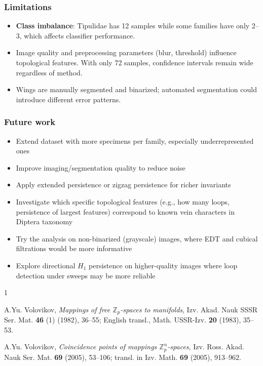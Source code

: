 \documentclass{birkjour}
\theoremstyle{definition}
\theoremstyle{remark}
\numberwithin{equation}{section}
\begin{document}
\subsubsection{Limitations}\quad

\begin{itemize}
    \item \textbf{Class imbalance}: Tipulidae has 12 samples while some families have only 2–3, which affects classifier performance.
    \item Image quality and preprocessing parameters (blur, threshold) influence topological features.
    With only 72 samples, confidence intervals remain wide regardless of method.
    \item Wings are manually segmented and binarized; automated segmentation could introduce different error patterns.
\end{itemize}

\subsubsection{Future work}\quad

\begin{itemize}
    \item Extend dataset with more specimens per family, especially underrepresented ones
    \item Improve imaging/segmentation quality to reduce noise
    \item Apply extended persistence or zigzag persistence for richer invariants
    \item Investigate which specific topological features (e.g., how many loops, persistence of largest features) correspond to known vein characters in Diptera taxonomy
    \item Try the analysis on non-binarized (grayscale) images, where EDT and cubical filtrations would be more informative
    \item Explore directional \(H_1\) persistence on higher-quality images where loop detection under sweeps may be more reliable
\end{itemize}






\begin{thebibliography}{1}

 A.Yu. Volovikov, \textit{Mappings of free $\mathbb{Z}_{p}$-spaces to manifolds}, Izv. Akad. Nauk SSSR Ser. Mat. \textbf{46} (1) (1982), 36--55; English transl., Math. USSR-Izv. \textbf{20} (1983), 35--53.

 A.Yu. Volovikov, \textit{Coincidence points of mappings $\mathbb{Z}_{p}^{n}$-spaces}, Izv. Ross. Akad.
Nauk Ser. Mat. \textbf{69} (2005), 53--106; transl. in Izv. Math. \textbf{69} (2005), 913--962.

\end{thebibliography}

\end{document}
